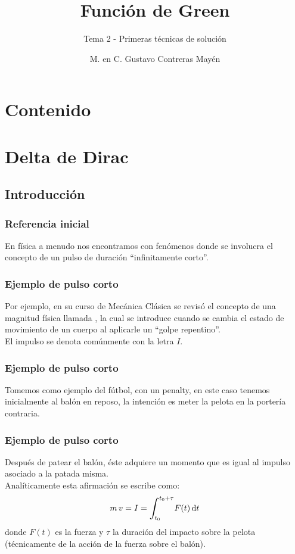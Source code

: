 \documentclass[12pt]{beamer}
\date{}
\title{\large{Función de Green}}
\subtitle{Tema 2 - Primeras técnicas de solución}
\author{M. en C. Gustavo Contreras Mayén}
\begin{document}
\maketitle
\fontsize{14}{14}\selectfont
{}

\section*{Contenido}

\section{Delta de Dirac}
\subsection{Introducción}

\begin{frame}
\frametitle{Referencia inicial}
En física a menudo nos encontramos con fenómenos donde se involucra el concepto de un pulso de duración \enquote{infinitamente corto}.
\end{frame}

\begin{frame}
\frametitle{Ejemplo de pulso corto}
Por ejemplo, en su curso de Mecánica Clásica se revisó el concepto de una magnitud física llamada , \pause la cual se introduce cuando se cambia el estado de movimiento de un cuerpo al aplicarle un \enquote{golpe repentino}.
\\
\bigskip
\pause
El impulso se denota comúnmente con la letra $I$.
\end{frame}

\begin{frame}
\frametitle{Ejemplo de pulso corto}
Tomemos como ejemplo del fútbol, con un penalty, \pause en este caso tenemos inicialmente al balón en reposo, \pause la intención es meter la pelota en la portería contraria.
\end{frame}

\begin{frame}
\frametitle{Ejemplo de pulso corto}
Después de patear el balón, éste adquiere un momento que es igual al impulso asociado a la patada misma.
\\
\bigskip
\pause
Analíticamente esta afirmación se escribe como:
\pause
\begin{align*}
m \, v = I = \scaleint{6ex}_{\bs t_{0}}^{t_{0} + \tau} F (t) \dd{t}
\end{align*}
donde $F (t)$ es la fuerza y $\tau$ la duración del impacto sobre la pelota (técnicamente de la acción de la fuerza sobre el balón).
\end{frame}
\end{document}
